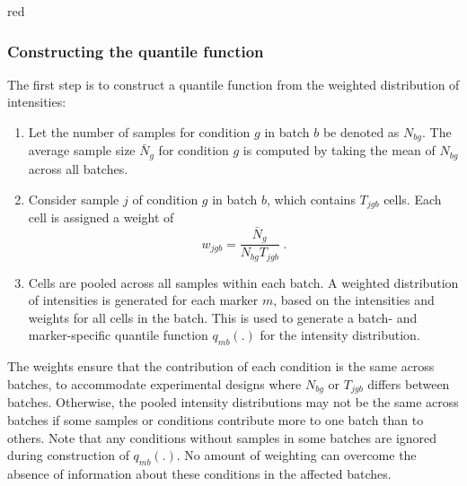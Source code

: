 \documentclass{article}
\begin{document}
\begin{color}{red}
\subsubsection{Constructing the quantile function}
The first step is to construct a quantile function from the weighted distribution of intensities:
\begin{enumerate}
    \item Let the number of samples for condition $g$ in batch $b$ be denoted as $N_{bg}$.
        The average sample size $\bar{N}_g$ for condition $g$ is computed by taking the mean of $N_{bg}$ across all batches.
    \item Consider sample $j$ of condition $g$ in batch $b$, which contains $T_{jgb}$ cells.
        Each cell is assigned a weight of 
        \[
            w_{jgb} = \frac{\bar{N}_g}{N_{bg}T_{jgb}} \;.
        \]
    \item Cells are pooled across all samples within each batch.
        A weighted distribution of intensities is generated for each marker $m$, based on the intensities and weights for all cells in the batch.
        This is used to generate a batch- and marker-specific quantile function $q_{mb}(.)$ for the intensity distribution.
\end{enumerate}
The weights ensure that the contribution of each condition is the same across batches, to accommodate experimental designs where $N_{bg}$ or $T_{jgb}$ differs between batches.
Otherwise, the pooled intensity distributions may not be the same across batches if some samples or conditions contribute more to one batch than to others.
Note that any conditions without samples in some batches are ignored during construction of $q_{mb}(.)$.
No amount of weighting can overcome the absence of information about these conditions in the affected batches.


\end{color}
\end{document}
